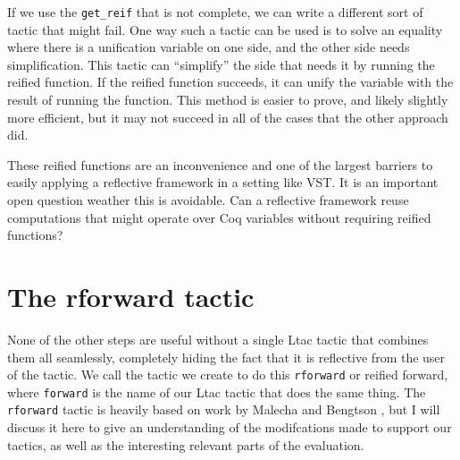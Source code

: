 \documentclass{puthesis}
\begin{document}
If we use the \lstinline|get_reif| that is not complete, we can write a
different sort of tactic that might fail. One way such a tactic can be
used is to solve an equality where there is a unification variable on
one side, and the other side needs simplification. This tactic can
``simplify'' the side that needs it by running the reified
function. If the reified function succeeds, it can unify the variable
with the result of running the function. This method is easier to
prove, and likely slightly more efficient, but it may not succeed in
all of the cases that the other approach did.

These reified functions are an inconvenience and one of the largest
barriers to easily applying a reflective framework in a setting like
VST. It is an important open question weather this is avoidable. Can
a reflective framework reuse computations that might operate
over Coq variables without requiring reified functions? 

\section{The rforward tactic}

None of the other steps are useful without a single Ltac tactic that
combines them all seamlessly, completely hiding the fact that it is
reflective from the user of the tactic. We call the tactic we create
to do this \lstinline|rforward| or reified forward, where
\lstinline|forward| is the name of our Ltac tactic that does the same
thing. The \lstinline|rforward| tactic is heavily based on work by
Malecha and Bengtson \cite{}, but I will discuss it here to give an
understanding of the modifcations made to support our tactics, as well
as the interesting relevant parts of the evaluation. 
\end{document}
